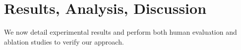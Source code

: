 \documentclass[letterpaper]{article} %
\begin{document}
\section{Results, Analysis, Discussion}

We now detail experimental results and perform both human evaluation and ablation studies to verify our approach. 


\end{document}
